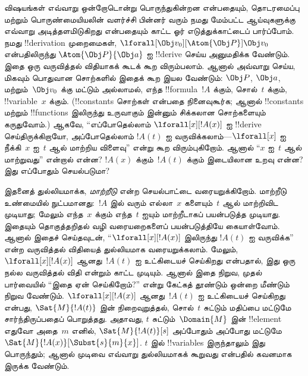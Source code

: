 \documentclass[../../../include/open-logic-section]{subfiles}
\begin{document}


விஷயங்கள் எவ்வாறு ஒன்றோடொன்று பொருந்துகின்றன என்பதையும், தொடரமைப்பு மற்றும்
பொருண்மையியலின் வளர்ச்சி பின்னர் வரும் நமது மேம்பட்ட ஆய்வுகளுக்கு எவ்வாறு
அடித்தளமிடுகிறது என்பதையும் காட்ட ஓர் எடுத்துக்காட்டைப் பார்ப்போம். நமது
!!{derivation} முறைமைகள், $\lforall[\Obj v_0][\Atom{\Obj P}]{\Obj v_0}$
என்பதிலிருந்து $\Atom{\Obj P}{\Obj a}$ ஐ !!{derive} செய்ய அனுமதிக்க வேண்டும்.
இதை ஒரு வருவித்தல் விதியாகக் கூடக் கூற விரும்பலாம். ஆனால் அவ்வாறு செய்ய,
மிகவும் பொதுவான சொற்களில் இதைக் கூற இயல வேண்டும்: $\Obj P$, $\Obj a$,
மற்றும்~$\Obj v_0$ க்கு மட்டும் அல்லாமல், எந்த !!{formula}~$!A$ க்கும்,
சொல்~$t$ க்கும், !!{variable}~$x$ க்கும். (!!{constant}s சொற்கள் என்பதை
நினைவுகூர்க; ஆனால் !!{constant}s மற்றும் !!{function}s இலிருந்து உருவாகும்
இன்னும் சிக்கலான சொற்களையும் கருதுவோம்.) ஆகவே, ``எப்போதெல்லாம்
$\lforall[x][!A(x)]$ ஐ !!{derive} செய்திருக்கிறாயோ, அப்போதெல்லாம்
$!A(t)$ ஐ வருவிக்கலாம்---$\lforall[x]$ ஐ நீக்கி~$x$ ஐ~$t$ ஆல் மாற்றிய
விளைவு'' என்று கூற விரும்புகிறோம். ஆனால் ``$x$ ஐ~$t$ ஆல் மாற்றுவது'' என்றால்
என்ன? $!A(x)$ க்கும்~$!A(t)$ க்கும் இடையிலான உறவு என்ன? இது எப்போதும்
செயல்படுமா?

இதனைத் துல்லியமாக்க, \emph{மாற்றீடு} என்ற செயல்பாட்டை வரையறுக்கிறோம்.
மாற்றீடு உண்மையில் நுட்பமானது:~$!A$ இல் வரும் எல்லா~$x$ களையும்~$t$ ஆல்
மாற்றிவிட முடியாது; மேலும் எந்த~$x$ க்கும் எந்த~$t$ ஐயும் மாற்றீடாகப்
பயன்படுத்த முடியாது. இதையும் தொகுத்தறிதல் வழி வரையறைகளைப் பயன்படுத்தியே
கையாள்வோம். ஆனால் இதைச் செய்தவுடன், ``$\lforall[x][!A(x)]$ இலிருந்து
$!A(t)$ ஐ வருவிக்க'' என்ற வருவித்தல் விதியைத் துல்லியமாக வரையறுக்கலாம்.
மேலும், $\lforall[x][!A(x)]$ ஆனது~$!A(t)$ ஐ உட்கிடையச் செய்கிறது என்பதால்,
இது ஒரு நல்ல வருவித்தல் விதி என்றும் காட்ட முடியும். ஆனால் இதை நிறுவ,
முதல் பார்வையில் ``இதை ஏன் செய்கிறோம்?'' என்று கேட்கத் தூண்டும் ஒன்றை
மீண்டும் நிறுவ வேண்டும். $\lforall[x][!A(x)]$ ஆனது~$!A(t)$ ஐ உட்கிடையச்
செய்கிறது என்பது, $\Sat{M}{!A(t)}$ இன் நிறைவுறுத்தல், சொல்~$t$ சுட்டும் மதிப்பை மட்டுமே
சார்ந்திருப்பதைப் பொறுத்தது. அதாவது, $t$ சுட்டும்~$\Domain{M}$ இன் !!{element}
எதுவோ அதை~$m$ எனில்,
$\Sat{M}{!A(t)}[s]$ அப்போதும் அப்போது மட்டுமே
$\Sat{M}{!A(x)}[\Subst{s}{m}{x}]$. $t$ இல் !!{variable}s இருந்தாலும் இது
பொருந்தும்; ஆனால் முடிவை எவ்வாறு துல்லியமாகக் கூறுவது என்பதில் கவனமாக இருக்க
வேண்டும்.
\end{document}
